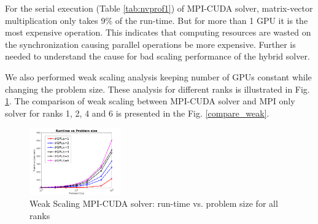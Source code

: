 \documentclass[sigplan,screen]{acmart}
\begin{document}
For the serial execution (Table \ref{tab:nvprof1}) of MPI-CUDA solver, matrix-vector multiplication only takes 9\% of the run-time. But for more than 1 GPU it is the most expensive operation. This indicates that computing resources are wasted on the synchronization causing parallel operations be more expensive. Further is needed to understand the cause for bad scaling performance of the hybrid solver.

We also performed weak scaling analysis keeping number of GPUs constant while changing the problem size. These analysis for different ranks is illustrated in Fig. \ref{cuda-weak}. The comparison of weak scaling between MPI-CUDA solver and MPI only solver for ranks 1, 2, 4 and 6 is presented in the Fig. \ref{compare_weak}.

\begin{figure}[h!]
	\begin{center}
		\includegraphics[width=0.35\textwidth]{plots/CUDA_weak_allrank.png}
	\end{center}
	\caption{Weak Scaling MPI-CUDA solver: run-time vs. problem size for all ranks}
	\label{cuda-weak}      
\end{figure}
\end{document}

